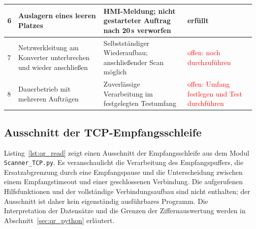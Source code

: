 \begin{table}[htbp]
\begin{tabular}{|p{}|p{}|p{}|p{}|}
    {\raggedright 6\par} & {\raggedright Auslagern eines leeren Platzes\par} & {\raggedright HMI-Meldung; nicht gestarteter Auftrag nach 20\,s verworfen\par} & {\raggedright erfüllt\par} \\ \hline
    {\raggedright 7\par} & {\raggedright Netzwerkleitung am Konverter unterbrechen und wieder anschließen\par} & {\raggedright Selbstständiger Wiederaufbau; anschließender Scan möglich\par} & {\raggedright \textcolor{red}{offen: noch durchzuführen}\par} \\ \hline
    {\raggedright 8\par} & {\raggedright Dauerbetrieb mit mehreren Aufträgen\par} & {\raggedright Zuverlässige Verarbeitung im festgelegten Testumfang\par} & {\raggedright \textcolor{red}{offen: Umfang festlegen und Test durchführen}\par} \\ \hline
  \end{tabular}
\end{table}

\clearpage
\subsection{Ausschnitt der TCP-Empfangsschleife}
\label{sec:anhang_qr_code}

Listing~\ref{lst:qr_read} zeigt einen Ausschnitt der Empfangsschleife aus dem Modul \texttt{Scanner\_TCP.py}. Es veranschaulicht die Verarbeitung des Empfangspuffers, die Ersatzabgrenzung durch eine Empfangspause und die Unterscheidung zwischen einem Empfangstimeout und einer geschlossenen Verbindung. Die aufgerufenen Hilfsfunktionen und der vollständige Verbindungsaufbau sind nicht enthalten; der Ausschnitt ist daher kein eigenständig ausführbares Programm. Die Interpretation der Datensätze und die Grenzen der Ziffernauswertung werden in Abschnitt~\ref{sec:qr_python} erläutert.


